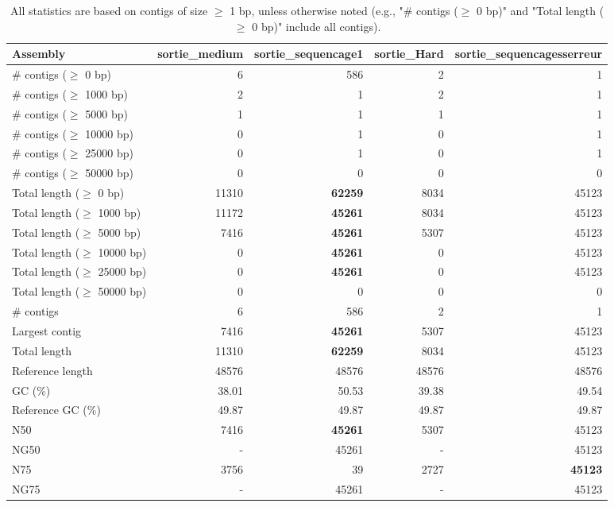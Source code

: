 \documentclass[12pt,a4paper]{article}
\begin{document}
\begin{table}[ht]
\begin{center}
\caption{All statistics are based on contigs of size $\geq$ 1 bp, unless otherwise noted (e.g., "\# contigs ($\geq$ 0 bp)" and "Total length ($\geq$ 0 bp)" include all contigs).}
\begin{tabular}{|l*{4}{|r}|}
\hline
Assembly & sortie\_medium & sortie\_sequencage1 & sortie\_Hard & sortie\_sequencagesserreur \\ \hline
\# contigs ($\geq$ 0 bp) & 6 & 586 & 2 & 1 \\ \hline
\# contigs ($\geq$ 1000 bp) & 2 & 1 & 2 & 1 \\ \hline
\# contigs ($\geq$ 5000 bp) & 1 & 1 & 1 & 1 \\ \hline
\# contigs ($\geq$ 10000 bp) & 0 & 1 & 0 & 1 \\ \hline
\# contigs ($\geq$ 25000 bp) & 0 & 1 & 0 & 1 \\ \hline
\# contigs ($\geq$ 50000 bp) & 0 & 0 & 0 & 0 \\ \hline
Total length ($\geq$ 0 bp) & 11310 & {\bf 62259} & 8034 & 45123 \\ \hline
Total length ($\geq$ 1000 bp) & 11172 & {\bf 45261} & 8034 & 45123 \\ \hline
Total length ($\geq$ 5000 bp) & 7416 & {\bf 45261} & 5307 & 45123 \\ \hline
Total length ($\geq$ 10000 bp) & 0 & {\bf 45261} & 0 & 45123 \\ \hline
Total length ($\geq$ 25000 bp) & 0 & {\bf 45261} & 0 & 45123 \\ \hline
Total length ($\geq$ 50000 bp) & 0 & 0 & 0 & 0 \\ \hline
\# contigs & 6 & 586 & 2 & 1 \\ \hline
Largest contig & 7416 & {\bf 45261} & 5307 & 45123 \\ \hline
Total length & 11310 & {\bf 62259} & 8034 & 45123 \\ \hline
Reference length & 48576 & 48576 & 48576 & 48576 \\ \hline
GC (\%) & 38.01 & 50.53 & 39.38 & 49.54 \\ \hline
Reference GC (\%) & 49.87 & 49.87 & 49.87 & 49.87 \\ \hline
N50 & 7416 & {\bf 45261} & 5307 & 45123 \\ \hline
NG50 & - & 45261 & - & 45123 \\ \hline
N75 & 3756 & 39 & 2727 & {\bf 45123} \\ \hline
NG75 & - & 45261 & - & 45123 \\ \hline

\end{tabular}
\end{center}
\end{table}
\end{document}
